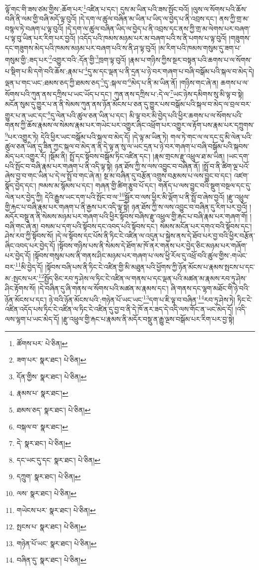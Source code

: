 ལྟོ་གང་གི་ཟས་ཙམ་གྱིས་:ཆོག་པར་\footnote{ཚོགས་པར་  པེ་ཅིན། }འཛིན་པ་དང་། དུས་མ་ཡིན་པའི་ཟས་སྤོང་བའོ། །ལུས་ལ་སོགས་པའི་ཆོས་བཞི་ནི་ལམ་གྱི་བཞི་མདོ་ལྟ་བུའོ། །དེ་དག་ལ་ཚུལ་བཞིན་མ་ཡིན་པ་ཡིད་ལ་བྱེད་པ་ནི་འབྲས་དང་། ནས་ཀྱི་གྲ་མ་བསྙལ་ཏེ་བཞག་པ་ལྟ་བུའོ། །དེ་དག་ལ་ཚུལ་བཞིན་ཡིད་ལ་བྱེད་པ་ནི་འབྲས་དང་ནས་ཀྱི་གྲ་མ་ལེགས་པར་བཞག་པ་ལྟ་བུ་ཡིན་པར་རིག་པར་བྱའོ། །འདོད་པའི་ཁམས་མཉམ་པར་མ་བཞག་པའི་ས་ནི་པགས་པ་ལྟ་བུའོ། །གཟུགས་དང་གཟུགས་མེད་པའི་ཁམས་མཉམ་པར་བཞག་པའི་ས་ནི་ཤ་ལྟ་བུའོ། །མ་རིག་པའི་ཁམས་གསུམ་དུ་ཟག་པ་གསུམ་གྱི་:ཟད་པར་\footnote{ཟག་པར་  སྣར་ཐང་།  པེ་ཅིན། }འགྱུར་བའི་:དོན་གྱི་\footnote{དོན་གྱིས་  སྣར་ཐང་།  པེ་ཅིན། }ཁྲག་ལྟ་བུའོ། །རྣམ་པ་གཉིས་ཀྱིས་སྔར་བསྟན་པའི་ཆགས་པ་ལ་སོགས་པ་སྡིག་པ་མི་དགེ་བའི་ཆོས་:རྣམ་པ་\footnote{རྣམས་པ་  སྣར་ཐང་། }དུ་མ་དང་ལྡན་པ་ནི་དྲན་པ་ཉེ་བར་གཞག་པ་བཞི་བསྒོམ་པའི་སྐལ་བ་མེད་དེ། ལྡན་པ་གང་ཡང་:ཐམས་ཅད་ཀྱི་ཐམས་ཅད་\footnote{ཐམས་ཅད་  སྣར་ཐང་།  པེ་ཅིན། }དུ་:སྐལ་བ་\footnote{བསྐལ་བ་  སྣར་ཐང་། }མེད་པ་ནི་མ་ཡིན་ནོ། །གཉིས་གང་ཞེ་ན། ཆགས་པ་ལ་སོགས་པའི་ཀུན་ནས་དཀྲིས་པ་ཡང་ཡོད་པ་དང་། ཀུན་ནས་དཀྲིས་པ་:དེ་ལ་\footnote{དེ་  སྣར་ཐང་།  པེ་ཅིན། }ཡང་ཉེས་དམིགས་སུ་མི་ལྟ་བ་སྟེ། མངོན་སུམ་དུ་གྱུར་པ་ན་ནི་སེམས་ཀུན་ནས་ཉོན་མོངས་པ་ཅན་དུ་གྱུར་པས་བསྒོམ་པའི་སྐལ་བ་མེད་ལ་བྲལ་བར་གྱུར་པ་ན་ཡང་དང་\footnote{དང་ཡང་དུ་དང་  སྣར་ཐང་།  པེ་ཅིན། }དུ་ལེན་པའི་ཚུལ་ཅན་ཡིན་པ་དང་། མི་ལྟ་བར་མི་བྱེད་པའི་ཕྱིར་ཆགས་པ་ལ་སོགས་པའི་གནས་ཀྱི་ཆོས་རྣམས་ལ་སེམས་རྣམ་པར་གཡེང་པར་འགྱུར་ཞིང་འཕྲོག་པར་འགྱུར་ལ་རྟོག་པས་རྣམ་པར་དཀྲུགས་\footnote{དཀྲུག་  སྣར་ཐང་།  པེ་ཅིན། }པར་འགྱུར་ཏེ། དེའི་ཕྱིར་ཡང་བསྒོམ་པའི་སྐལ་བ་མེད་དོ། །དེ་ལྟ་མ་ཡིན་ཏེ། གལ་ཏེ་གང་ལ་ལ་དང་དུ་མི་ལེན་པའི་ཚུལ་ཅན་ཡིན་དུ་ཟིན་ཀྱང་སྐལ་བ་མེད་ན་ནི་དེ་ལྟ་ན་སུ་ལ་ཡང་དྲན་པ་ཉེ་བར་གཞག་པ་བཞི་བསྒོམ་པའི་སྐབས་མེད་པར་འགྱུར་རོ། །སྡོམ་ནི། སྤྲོ་དང་སྟོབས་བསྒོམ་ཏིང་འཛིན་དང་། །རྣམ་གྲངས་རྫུ་འཕྲུལ་ཐ་མ་ཡིན། །ཡང་དག་པའི་སྤོང་བ་བཞི་རྣམ་པར་གཞག་པ་ནི་འདི་ལྟ་སྟེ། ཉན་ཐོས་ཀྱི་ས་ལས་འབྱུང་བ་བཞིན་ནོ། །སྤྲོ་བ་ནི་ཚིག་ལྔ་པའོ་ཞེས་བྱ་བ་གང་ཡིན་པ་དེ་ལ་སྤྲོ་བ་གང་ཞེ་ན། སྔ་མ་བཞིན་དུ་བརྩོན་འགྲུས་བརྩམས་པ་ལས་བྱུང་བ་དང་། འཛག་སྣོད་བྱེད་དང་། ཁམས་མ་སྙོམས་པ་དང་། གཞན་གྱི་ཚིག་རྩུབ་པོ་དང་། གནོད་པ་ལས་བྱུང་བའི་སྡུག་བསྔལ་དང་དུ་ལེན་པར་བྱེད་ཀྱི། དེའི་རྒྱུས་ཡང་དག་པའི་སྤོང་བ་ལ་\footnote{ལས་  སྣར་ཐང་།  པེ་ཅིན། }སྦྱོར་བ་ལས་ཕྱིར་མི་ལྡོག་པ་ནི་སྤྲོ་བ་ཞེས་བྱའོ། །རྫུ་འཕྲུལ་གྱི་རྐང་པ་བཞི་རྣམ་པར་གཞག་པ་ནི་རྒྱས་པར་འདི་ལྟ་སྟེ། ཉན་ཐོས་ཀྱི་ས་ལས་འབྱུང་བ་བཞིན་དུ་རིག་པར་བྱའོ། །མདོར་བསྡུ་ན་ནི་སེམས་མཉམ་པར་གཞག་པའི་ཕྱིར་སྟོབས་བཞིས་རྫུ་འཕྲུལ་གྱི་རྐང་པ་བཞི་རྣམ་པར་གཞག་གོ། །བཞི་གང་ཞེ་ན། བསམ་པ་དག་པའི་སྟོབས་དང་འབད་པའི་སྟོབས་དང་། སེམས་མངོན་པར་དགའ་བའི་སྟོབས་དང་། ཤེས་རབ་ཀྱི་སྟོབས་སོ། །དེ་ལ་སྟོབས་དང་པོས་ནི་ཏིང་ངེ་འཛིན་ལ་འདུན་པ་སྐྱེས་ནས་དེ་ཐོབ་པར་བྱ་བའི་ཕྱིར་བརྩོན་ཞིང་འབད་པར་བྱེད་དོ། །སྟོབས་གཉིས་པས་ནི་སེམས་དེ་ཐོག་མ་ཁོ་ནར་གནས་པར་བྱེད་ཅིང་མཉམ་པར་གཞོག་པར་བྱེད་དོ། །སྟོབས་གསུམ་པས་ནི་གནས་ཤིང་མཉམ་པར་གཞག་པ་ལས་ཕྱི་རོལ་དུ་འཕྲོ་བའི་ཚུལ་གྱིས་:གཡེང་བར་\footnote{གཡེངས་པར་  སྣར་ཐང་།  པེ་ཅིན། }མི་བྱེད་དོ། །སྟོབས་བཞི་པས་ནི་ཏིང་ངེ་འཛིན་གྱི་མི་མཐུན་པའི་ཕྱོགས་ཀྱི་ཉོན་མོངས་པ་རྣམས་སྤངས་པ་དང་མ་:སྤངས་པར་\footnote{སྤངས་པ་  སྣར་ཐང་།  པེ་ཅིན། }སྤྱོད་ཅིང་རབ་ཏུ་ཤེས་ལ་ཏིང་ངེ་འཛིན་ལ་གནས་པ་དང་ལྡན་པའི་མཚན་མ་རྣམས་རབ་ཏུ་ཤེས་ཤིང་རྟོགས་སོ། །དེ་བཞིན་དུ་ཞི་གནས་ལ་སོགས་པའི་མཚན་མ་རྣམས་དང་། ཞི་གནས་དང་ལྷག་མཐོང་གི་ཉེ་བའི་ཉོན་མོངས་པ་དང་། ཉེ་བའི་ཉོན་མོངས་པའི་:གཉེན་པོ་ཡང་ཡང་\footnote{གཉེན་པོ་ཡང་  སྣར་ཐང་།  པེ་ཅིན། }དག་པ་ཇི་ལྟ་བ་བཞིན་\footnote{བཞིན་དུ་  སྣར་ཐང་།  པེ་ཅིན། }རབ་ཏུ་ཤེས་ཏེ། ཏིང་ངེ་འཛིན་འདོད་པས་ཏིང་ངེ་འཛིན་ལ་ཏིང་ངེ་འཛིན་དུ་བྱ་བ་ནི་དེ་ཁོ་ནར་ཟད་དེ་འདི་ལས་གོང་ན་ཡང་མེད་དོ། །འདི་ལས་ལྷག་པ་ཡང་མེད་དོ། །རྫུ་འཕྲུལ་གྱི་རྐང་པ་རྣམས་ནི་མདོར་བསྡུ་ན་རྒྱུ་ལྔས་བསྒོམ་པར་རིག་པར་བྱ་སྟེ། 